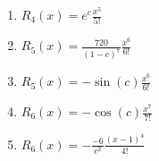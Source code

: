 \documentclass[../practica_05.tex]{subfiles}
\begin{document}
    \begin{enumerate}
        \item $R_4(x) = e^c\frac{x^5}{5!}$
        \item $R_5(x) = \frac{720}{(1-c)^7}\frac{x^6}{6!}$
        \item $R_5(x) = -\sin(c)\frac{x^6}{6!}$
        \item $R_6(x) = -\cos(c)\frac{x^7}{7!}$
        \item $R_6(x) = -\frac{-6}{c^2}\frac{(x-1)^4}{4!}$
    \end{enumerate}
\end{document}

